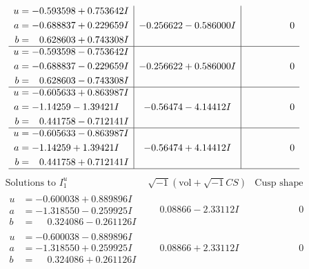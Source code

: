 \documentclass[1p]{elsarticle_modified}
\theoremstyle{definition}
\newcommand{\I}{\sqrt{-1}}
\begin{document}
$$\begin{array}{c|c|c}
\begin{aligned}
u &= -0.593598 + 0.753642 I \\
a &= -0.688837 + 0.229659 I \\
b &= \phantom{-}0.628603 + 0.743308 I\end{aligned}
 & -0.256622 - 0.586000 I & \phantom{-0.000000 } 0 \\ \hline\begin{aligned}
u &= -0.593598 - 0.753642 I \\
a &= -0.688837 - 0.229659 I \\
b &= \phantom{-}0.628603 - 0.743308 I\end{aligned}
 & -0.256622 + 0.586000 I & \phantom{-0.000000 } 0 \\ \hline\begin{aligned}
u &= -0.605633 + 0.863987 I \\
a &= -1.14259 - 1.39421 I \\
b &= \phantom{-}0.441758 - 0.712141 I\end{aligned}
 & -0.56474 - 4.14412 I & \phantom{-0.000000 } 0 \\ \hline\begin{aligned}
u &= -0.605633 - 0.863987 I \\
a &= -1.14259 + 1.39421 I \\
b &= \phantom{-}0.441758 + 0.712141 I\end{aligned}
 & -0.56474 + 4.14412 I & \phantom{-0.000000 } 0\\
 \hline 
 \end{array}$$\newpage$$\begin{array}{c|c|c}  
\text{Solutions to }I^u_{1}& \I (\text{vol} + \sqrt{-1}CS) & \text{Cusp shape}\\
 \hline 
\begin{aligned}
u &= -0.600038 + 0.889896 I \\
a &= -1.318550 - 0.259925 I \\
b &= \phantom{-}0.324086 - 0.261126 I\end{aligned}
 & \phantom{-}0.08866 - 2.33112 I & \phantom{-0.000000 } 0 \\ \hline\begin{aligned}
u &= -0.600038 - 0.889896 I \\
a &= -1.318550 + 0.259925 I \\
b &= \phantom{-}0.324086 + 0.261126 I\end{aligned}
 & \phantom{-}0.08866 + 2.33112 I & \phantom{-0.000000 } 0 \\ \hline\begin{aligned}

\end{aligned}
\end{array}$$
\end{document}
